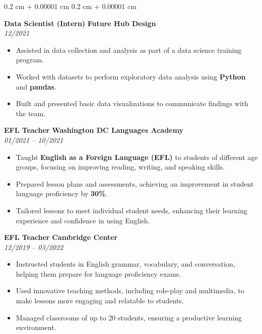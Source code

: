 \documentclass[10pt, letterpaper]{article}
\newenvironment{highlightsforbulletentries}{
    \begin{itemize}[
        topsep=0.10 cm,
        parsep=0.10 cm,
        partopsep=0pt,
        itemsep=0pt,
        leftmargin=10pt
    ]
}{
    \end{itemize}
} %
\newenvironment{onecolentry}{
    \begin{adjustwidth}{
        0.2 cm + 0.00001 cm
    }{
        0.2 cm + 0.00001 cm
    }
}{
    \end{adjustwidth}
} %
\begin{document}
\begin{onecolentry}
\begin{highlightsforbulletentries}
        \vspace{0.2 cm}
\noindent\textbf{Data Scientist (Intern)} \hfill \textbf{Future Hub Design} \\
\textit{12/2021} \\
\begin{itemize}
    \item Assisted in data collection and analysis as part of a data science training program.
    \item Worked with datasets to perform exploratory data analysis using \textbf{Python} and \textbf{pandas}.
    \item Built and presented basic data visualizations to communicate findings with the team.
\end{itemize}
        \vspace{0.2 cm}
\noindent\textbf{EFL Teacher} \hfill \textbf{Washington DC Languages Academy} \\
\textit{01/2021 – 10/2021} \\
\begin{itemize}
    \item Taught \textbf{English as a Foreign Language (EFL)} to students of different age groups, focusing on improving reading, writing, and speaking skills.
    \item Prepared lesson plans and assessments, achieving an improvement in student language proficiency by \textbf{30\%}.
    \item Tailored lessons to meet individual student needs, enhancing their learning experience and confidence in using English.
\end{itemize}
        \vspace{2 cm}

\noindent\textbf{EFL Teacher} \hfill \textbf{Cambridge Center} \\
\textit{12/2019 – 03/2022} \\
\begin{itemize}
    \item Instructed students in English grammar, vocabulary, and conversation, helping them prepare for language proficiency exams.
    \item Used innovative teaching methods, including role-play and multimedia, to make lessons more engaging and relatable to students.
    \item Managed classrooms of up to 20 students, ensuring a productive learning environment.
\end{itemize}

        \end{highlightsforbulletentries}
    \end{onecolentry}
        \vspace{0.2 cm}
\end{document}
